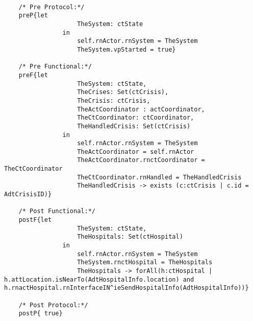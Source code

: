 	\scriptsize
	\vspace{0.5cm}
	\begin{lstlisting}[style=MessirStyle,firstnumber=auto,captionpos=b,caption={\msrmessir (MCL-oriented) specification of the operation \emph{oeSendHospitalInfo}.},label=OM-actCoordinator-oeSendHospitalInfo-MCL-LST]

	/* Pre Protocol:*/ 
	preP{let
					TheSystem: ctState
				in
					self.rnActor.rnSystem = TheSystem
					TheSystem.vpStarted = true}
	
	/* Pre Functional:*/
	preF{let
					TheSystem: ctState,
					TheCrises: Set(ctCrisis),
					TheCrisis: ctCrisis,
					TheActCoordinator : actCoordinator,
					TheCtCoordinator: ctCoordinator,
					TheHandledCrisis: Set(ctCrisis)
				in
					self.rnActor.rnSystem = TheSystem
					TheActCoordinator = self.rnActor
					TheActCoordinator.rnctCoordinator = TheCtCoordinator
					TheCtCoordinator.rnHandled = TheHandledCrisis
					TheHandledCrisis -> exists (c:ctCrisis | c.id = AdtCrisisID)}
	
	/* Post Functional:*/ 
	postF{let 
					TheSystem: ctState,
					TheHospitals: Set(ctHospital)
				in
					self.rnActor.rnSystem = TheSystem
					TheSystem.rnctHospital = TheHospitals
					TheHospitals -> forAll(h:ctHospital | h.attLocation.isNearTo(AdtHospitalInfo.location) and h.rnactHospital.rnInterfaceIN^ieSendHospitalInfo(AdtHospitalInfo))}
	
	/* Post Protocol:*/ 
	postP{ true}
	
	\end{lstlisting}
	\normalsize 
	
	
	
	





